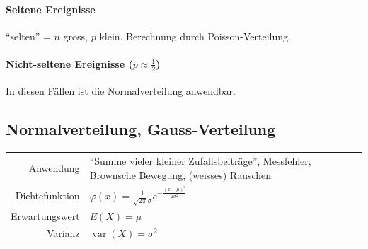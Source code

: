 \documentclass[10pt,a4paper]{scrartcl}
\newif\ifincludeDerivations
\DeclareMathOperator{\var}{var}
\begin{document}
\paragraph{Seltene Ereignisse} ``selten'' = $n$ gross, $p$ klein. Berechnung durch Poisson-Verteilung.
\ifincludeDerivations
Vermutung: Anzahl seltener Ereignisse ist Poisson-verteilt.
Beweis:
\begin{align*}
E(X) &= np = \lambda \\
\underbrace{P(X=k)}_{\text{Binomialverteilt}} & \stackrel{?}{\longrightarrow} P_\lambda(k) 
         = \frac{\lambda^k}{k!} e^{-k} \text{ für } n \to\infty \\
\binom{n}{k} p^k (1-p)^{n-k} &= \binom{n}{k} \left(\frac{\lambda}{n}\right)^k \left(1-\frac{\lambda}{n}\right)^{n-k} \\
    &= \frac{n(n-1)\cdots(n-k+1)}{1\cdot2\cdots k} \left(\frac{\lambda}{n}\right)^k 
            \left(1-\frac{\lambda}{n}\right)^n \left(1-\frac{\lambda}{n}\right)^{-k} \\
    & = \frac{\lambda^k}{k!} \underbrace{\left(1-\frac{\lambda}{n}\right)^n}_{\to e^{-\lambda}} 
             \underbrace{\left(1-\frac{\lambda}{n}\right)^{-k}}_{\to 1}
             \underbrace{\frac{n}{n}}_{\to 1} \underbrace{\frac{n-1}{n}}_{\to 1} \underbrace{\frac{n-2}{n}}_{\to 1} \cdots 
             \underbrace{\frac{n-k}{n}}_{\to 1} & \text{ mit } n\to\infty \\
    &  \to \frac{\lambda^k}{k!}e^{-\lambda} \quad \text{ für } n\to\infty
\end{align*}
\fi

\paragraph{Nicht-seltene Ereignisse ($p \approx \frac{1}{2}$)}
In diesen Fällen ist die Normalverteilung anwendbar.

\subsection{Normalverteilung, Gauss-Verteilung}
\begin{tabular}{r p{\katalogSpaltezwei}}
Anwendung & ``Summe vieler kleiner Zufallsbeiträge'', Messfehler, Brownsche Bewegung, (weisses) Rauschen \\
Dichtefunktion & $\varphi(x) = \frac{1}{\sqrt{2\pi}\sigma} e^{-\frac{(x-\mu)^2}{2\sigma^2}}$ \\
Erwartungswert & $ E(X) = \mu $ \\
Varianz & $\var(X) = \sigma^2 $
\end{tabular} 
\end{document}

